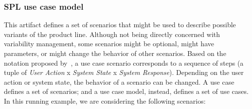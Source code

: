 \documentclass{acm_proc_article-sp}
\begin{document}
\subsubsection{SPL use case model} 

This artifact defines a set of scenarios that might be used to describe possible variants of the product line. Although not being directly concerned 
with variability management, some scenarios might be optional, might have parameters, or might change the behavior of other 
scenarios. Based on the notation proposed by~\cite{gcabral-sbmf-2006},  a use case scenario corresponds to a sequence of
steps (a tuple of \emph{User Action} x \emph{System State} x \emph{System Response}). Depending on the user action or system state, 
the behavior of a scenario can be changed. A use case defines a set of scenarios; and a use case model, instead, defines a set of use cases.
In this running example, we are considering the following scenarios:
\end{document}
